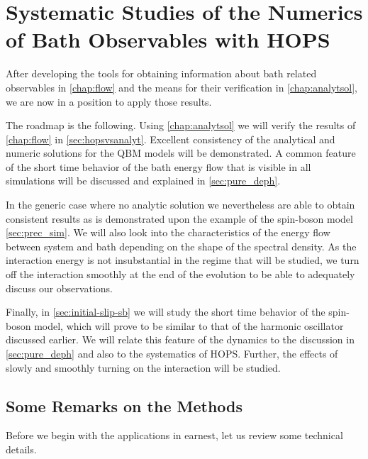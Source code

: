 \chapter{Systematic Studies of the Numerics of Bath Observables with
  HOPS}
\label{chap:numres}
After developing the tools for obtaining information about bath
related observables in \cref{chap:flow} and the means for their
verification in \cref{chap:analytsol}, we are now in a position to
apply those results.

The roadmap is the following. Using \cref{chap:analytsol} we will
verify the results of \cref{chap:flow} in
\cref{sec:hopsvsanalyt}. Excellent consistency of the analytical and
numeric solutions for the QBM models will be demonstrated.  A common
feature of the short time behavior of the bath energy flow that is
visible in all simulations will be discussed and explained in
\cref{sec:pure_deph}.

In the generic case where no analytic solution we nevertheless are
able to obtain consistent results as is demonstrated upon the example
of the spin-boson model \cref{sec:prec_sim}. We will also look
into the characteristics of the energy flow between system and bath
depending on the shape of the spectral density. As the interaction
energy is not insubstantial in the regime that will be studied, we
turn off the interaction smoothly at the end of the evolution to be
able to adequately discuss our observations.

Finally, in \cref{sec:initial-slip-sb} we will study the short time
behavior of the spin-boson model, which will prove to be similar to
that of the harmonic oscillator discussed earlier. We will relate this
feature of the dynamics to the discussion in \cref{sec:pure_deph} and
also to the systematics of HOPS. Further, the effects of slowly and
smoothly turning on the interaction will be studied.


\section{Some Remarks on the Methods}
\label{sec:meth}
Before we begin with the applications in earnest, let us review some
technical details.

